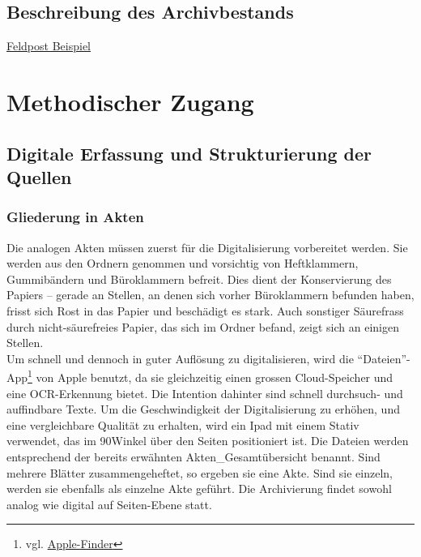 \documentclass[12pt, a4paper, ngerman, bidi=default]{article}
\begin{document}
\subsection{Beschreibung des Archivbestands}
\newpage

\href{https://free.iiifhosting.com/iiif/959173f8d808ab12ad7847917f79e0e4bc974ebce0040a07afd4b8be3f10c234/}{Feldpost Beispiel}

    
\section{Methodischer Zugang}
    
    \subsection{Digitale Erfassung und Strukturierung der Quellen}
    \subsubsection{Gliederung in Akten}

    Die analogen Akten müssen zuerst für die Digitalisierung vorbereitet werden. Sie werden aus den Ordnern genommen und vorsichtig von Heftklammern, 
    Gummibändern und Büroklammern befreit. Dies dient der Konservierung des Papiers – gerade an Stellen, an denen sich vorher Büroklammern befunden haben, 
    frisst sich Rost in das Papier und beschädigt es stark. Auch sonstiger Säurefrass durch nicht-säurefreies Papier, das sich im Ordner befand, zeigt sich an einigen Stellen.\\

    Um schnell und dennoch in guter Auflösung zu digitalisieren, wird die \enquote{Dateien}-App\footnote{vgl. \href{https://support.apple.com/de-de/guide/preview/prvw28034/mac}{Apple-Finder}} von 
    Apple benutzt, da sie gleichzeitig einen grossen Cloud-Speicher und eine OCR-Erkennung bietet. Die Intention dahinter sind schnell durchsuch- und auffindbare Texte.
    Um die Geschwindigkeit der Digitalisierung zu erhöhen, und eine vergleichbare Qualität zu erhalten, wird ein Ipad mit einem Stativ verwendet, das im 90\textdegree Winkel über den Seiten positioniert ist. 
    Die Dateien werden entsprechend der bereits erwähnten Akten\_Gesamtübersicht benannt. Sind mehrere Blätter zusammengeheftet, so ergeben sie eine Akte. Sind sie einzeln, werden sie ebenfalls als einzelne Akte geführt. Die Archivierung findet sowohl analog wie digital auf Seiten-Ebene statt.\\
  
\end{document}
